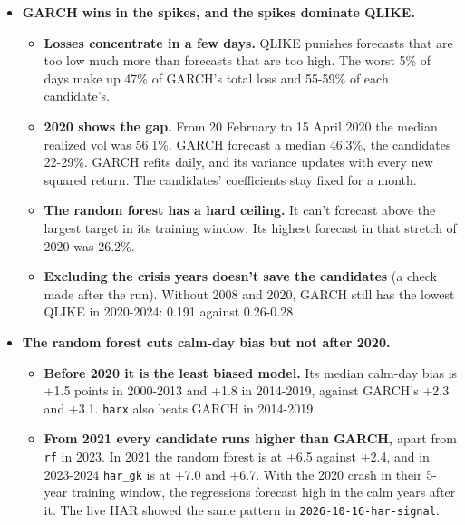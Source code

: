 \documentclass{article}
\begin{document}
\begin{itemize}

\item \textbf{GARCH wins in the spikes, and the spikes dominate QLIKE.}

\begin{itemize}

\item \textbf{Losses concentrate in a few days.} QLIKE punishes forecasts that are too low much more than forecasts that are too high. The worst 5\% of days make up 47\% of GARCH's total loss and 55-59\% of each candidate's.

\item \textbf{2020 shows the gap.} From 20 February to 15 April 2020 the median realized vol was 56.1\%. GARCH forecast a median 46.3\%, the candidates 22-29\%. GARCH refits daily, and its variance updates with every new squared return. The candidates' coefficients stay fixed for a month.

\item \textbf{The random forest has a hard ceiling.} It can't forecast above the largest target in its training window. Its highest forecast in that stretch of 2020 was 26.2\%.

\item \textbf{Excluding the crisis years doesn't save the candidates} (a check made after the run). Without 2008 and 2020, GARCH still has the lowest QLIKE in 2020-2024: 0.191 against 0.26-0.28.

\end{itemize}

\item \textbf{The random forest cuts calm-day bias but not after 2020.}

\begin{itemize}

\item \textbf{Before 2020 it is the least biased model.} Its median calm-day bias is +1.5 points in 2000-2013 and +1.8 in 2014-2019, against GARCH's +2.3 and +3.1. \texttt{harx} also beats GARCH in 2014-2019.

\item \textbf{From 2021 every candidate runs higher than GARCH,} apart from \texttt{rf} in 2023. In 2021 the random forest is at +6.5 against +2.4, and in 2023-2024 \texttt{har\_\allowbreak{}gk} is at +7.0 and +6.7. With the 2020 crash in their 5-year training window, the regressions forecast high in the calm years after it. The live HAR showed the same pattern in \texttt{2026-\allowbreak{}10-\allowbreak{}16-\allowbreak{}har-\allowbreak{}signal}.


\end{itemize}
\end{itemize}
\end{document}
